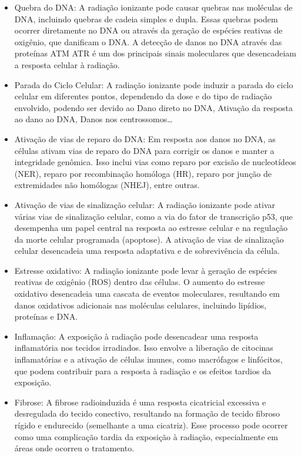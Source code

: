 \documentclass[11pt,a4paper]{article}
\begin{document}
		\begin{itemize}
			\item Quebra do DNA: A radiação ionizante pode causar quebras nas moléculas de DNA, incluindo quebras de cadeia simples e dupla. Essas quebras podem ocorrer diretamente no DNA ou através da geração de espécies reativas de oxigênio, que danificam o DNA. A detecção de danos no DNA através das proteínas ATM ATR é um dos principais sinais moleculares que desencadeiam a resposta celular à radiação.
			
			\item Parada do Ciclo Celular: A radiação ionizante pode induzir a parada do ciclo celular em diferentes pontos, dependendo da dose e do tipo de radiação envolvido, podendo ser devido ao Dano direto no DNA, Ativação da resposta ao dano ao DNA, Danos nos centrossomos\dots

			\item Ativação de vias de reparo do DNA: Em resposta aos danos no DNA, as células ativam vias de reparo do DNA para corrigir os danos e manter a integridade genômica. Isso inclui vias como reparo por excisão de nucleotídeos (NER), reparo por recombinação homóloga (HR), reparo por junção de extremidades não homólogas (NHEJ), entre outras.
			
			\item Ativação de vias de sinalização celular: A radiação ionizante pode ativar várias vias de sinalização celular, como a via do fator de transcrição p53, que desempenha um papel central na resposta ao estresse celular e na regulação da morte celular programada (apoptose). A ativação de vias de sinalização celular desencadeia uma resposta adaptativa e de sobrevivência da célula.
			
			\item Estresse oxidativo: A radiação ionizante pode levar à geração de espécies reativas de oxigênio (ROS) dentro das células. O aumento do estresse oxidativo desencadeia uma cascata de eventos moleculares, resultando em danos oxidativos adicionais nas moléculas celulares, incluindo lipídios, proteínas e DNA.
			
			\item Inflamação: A exposição à radiação pode desencadear uma resposta inflamatória nos tecidos irradiados. Isso envolve a liberação de citocinas inflamatórias e a ativação de células imunes, como macrófagos e linfócitos, que podem contribuir para a resposta à radiação e os efeitos tardios da exposição.
			
			\item Fibrose: A fibrose radioinduzida é uma resposta cicatricial excessiva e desregulada do tecido conectivo, resultando na formação de tecido fibroso rígido e endurecido (semelhante a uma cicatriz). Esse processo pode ocorrer como uma complicação tardia da exposição à radiação, especialmente em áreas onde ocorreu o tratamento.
		\end{itemize}
\end{document}
